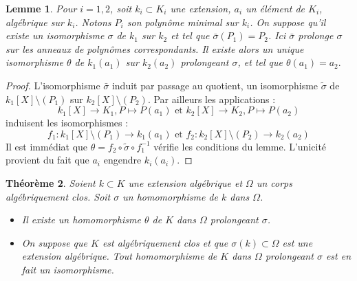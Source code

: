 \documentclass[12pt,a4paper]{report}
\newtheorem{thm}{\bf Th\'eor\`eme}
\newtheorem{lem}[thm]{\bf Lemme}
\begin{document}
\begin{lem}\rm
Pour $i=1,2$, soit $k_i \subset K_i$ une extension, $a_i$ un élément de $K_i$, algébrique sur $k_i$. Notons $P_i$ son polynôme minimal sur $k_i$. On suppose qu'il existe un isomorphisme $\sigma$ de $k_1$ sur $k_2$ et tel que $\bar{\sigma}(P_1)=P_2$. Ici $\bar{\sigma}$ prolonge $\sigma$ sur les anneaux de polynômes correspondants. Il existe alors un unique isomorphisme $\theta$ de $k_1(a_1)$ sur $k_2(a_2)$ prolongeant $\sigma$, et tel que $\theta(a_1)=a_2.$ 
\end{lem}

\begin{proof}
L'isomorphisme $\bar{\sigma}$ induit par passage au quotient, un isomorphisme $\tilde{\sigma}$ de $k_1[X]\setminus (P_1)$ sur $k_2[X]\setminus (P_2)$. Par ailleurs les applications : 
$$k_1[X]\rightarrow K_1, P \mapsto P(a_1) \text{  et  }k_2[X]\rightarrow K_2, P \mapsto P(a_2)$$
induisent les isomorphismes : 
$$f_1 : k_1[X]\setminus (P_1)\rightarrow k_1(a_1) \text{  et  }f_2 : k_2[X]\setminus (P_2)\rightarrow k_2(a_2)$$
Il est immédiat que $\theta=f_2\circ \tilde{\sigma}\circ f_1^{-1}$ vérifie les conditions du lemme. L'unicité provient du fait que $a_i$ engendre $k_i(a_i)$.
\end{proof}

\begin{thm}\rm
Soient $k\subset K $ une extension algébrique et $\Omega$ un corps algébriquement clos. Soit $\sigma$ un homomorphisme de $k$ dans $\Omega$. 
\begin{itemize}
\item Il existe un homomorphisme $\theta$ de $K$ dans $\Omega$ prolongeant $\sigma$. 
\item On suppose que $K$ est algébriquement clos et que $\sigma(k)\subset \Omega$ est une extension algébrique. Tout homomorphisme de $K$ dans $\Omega$ prolongeant $\sigma$ est en fait un isomorphisme. 

\end{itemize}
\end{thm}
\end{document}
